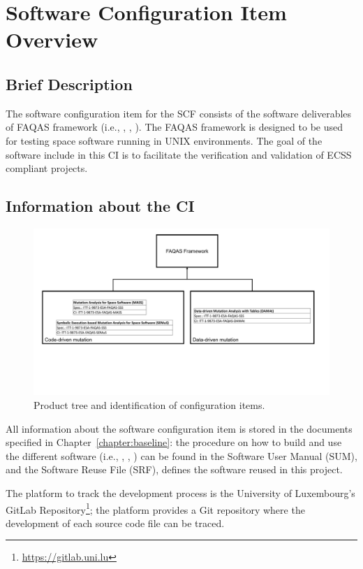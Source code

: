 
\chapter{Software Configuration Item Overview}

\section{Brief Description}

The software configuration item for the SCF consists of the software deliverables of FAQAS framework (i.e., \MASS, \SEMUS, \DAMA). The FAQAS framework is designed to be used for testing space software running in UNIX environments. The goal of the software include in this CI is to facilitate the verification and validation of ECSS compliant projects.

\section{Information about the CI}

\begin{figure}[t]
  \centering
	\includegraphics[width=\textwidth]{images/CI_tree.pdf}
      \caption{Product tree and identification of configuration items.}
      \label{fig:ci:tree}
\end{figure}

All information about the software configuration item is stored in the documents specified in Chapter~\ref{chapter:baseline}: the procedure on how to build and use the different software (i.e., \MASS, \SEMUS, \DAMA) can be found in the Software User Manual (SUM), and the Software Reuse File (SRF), defines the software reused in this project.

The platform to track the development process is the University of Luxembourg's GitLab Repository\footnote{\url{https://gitlab.uni.lu}}; the platform provides a Git repository where the development of each source code file can be traced.

